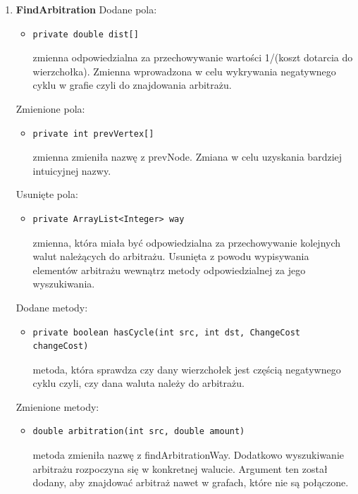 \documentclass[12pt]{article}
\begin{document}
\begin{enumerate}
\item \textbf{FindArbitration}
\newline\newline
   Dodane pola:
    \begin{itemize}
        \item \begin{verbatim}private double dist[]\end{verbatim}
        zmienna odpowiedzialna za przechowywanie wartości 1/(koszt dotarcia do wierzchołka). Zmienna wprowadzona w celu wykrywania negatywnego cyklu w grafie czyli do znajdowania arbitrażu.
    \end{itemize}
    Zmienione pola:
    \begin{itemize}
    \item \begin{verbatim}private int prevVertex[]\end{verbatim}
        zmienna zmieniła nazwę z prevNode. Zmiana w celu uzyskania bardziej intuicyjnej nazwy.
    \end{itemize}
    Usunięte pola:
     \begin{itemize}
     \item \begin{verbatim}private ArrayList<Integer> way\end{verbatim}
        zmienna, która miała być odpowiedzialna za przechowywanie kolejnych walut należących do arbitrażu. Usunięta z powodu wypisywania elementów arbitrażu wewnątrz metody odpowiedzialnej za jego wyszukiwania.
    \end{itemize}
    Dodane metody:
    \begin{itemize}
     \item \begin{verbatim}private boolean hasCycle(int src, int dst, ChangeCost changeCost)\end{verbatim}
        metoda, która sprawdza czy dany wierzchołek jest częścią negatywnego cyklu czyli, czy dana waluta należy do arbitrażu.
    \end{itemize}
    Zmienione metody:
    \begin{itemize}
     \item \begin{verbatim}double arbitration(int src, double amount)\end{verbatim}
        metoda zmieniła nazwę z findArbitrationWay. Dodatkowo wyszukiwanie arbitrażu rozpoczyna się w konkretnej walucie. Argument ten został dodany, aby znajdować arbitraż nawet w grafach, które nie są połączone.

\end{itemize}
\end{enumerate}
\end{document}
